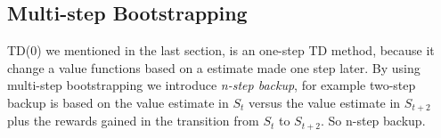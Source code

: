 \documentclass[11pt]{article}
\begin{document}
\subsection{Multi-step Bootstrapping}
TD(0) we mentioned in the last section, is an one-step TD method, because it change a value functions based on a estimate made one step later. By using multi-step bootstrapping we introduce \textit{n-step backup}, for example two-step backup is based on the value estimate in $S_{t}$ versus the value estimate in $S_{t+2}$ plus the rewards gained in the transition from $S_{t}$ to $S_{t + 2}$. So n-step backup.
\end{document}
